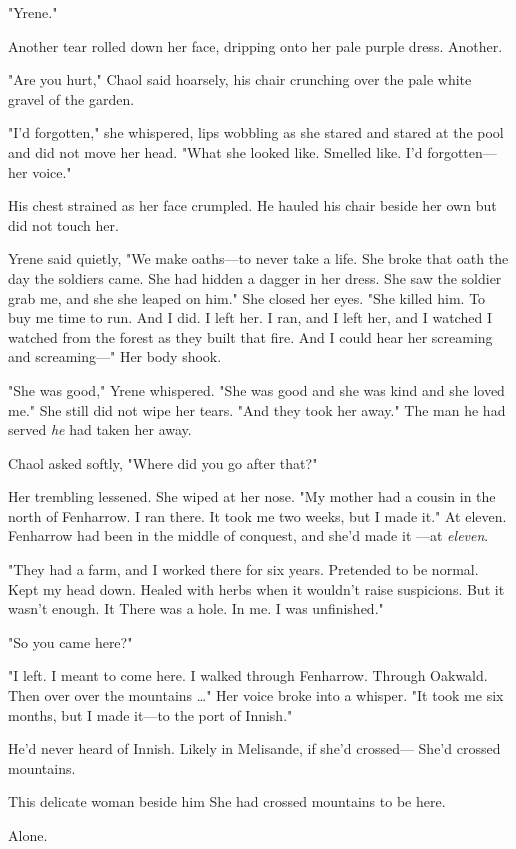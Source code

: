 "Yrene."

Another tear rolled down her face, dripping onto her pale purple dress. Another.

"Are you hurt," Chaol said hoarsely, his chair crunching over the pale white gravel of the garden.

"I'd forgotten," she whispered, lips wobbling as she stared and stared at the pool and did not move her head. "What she looked like. Smelled like. I'd forgotten---her voice."

His chest strained as her face crumpled. He hauled his chair beside her own but did not touch her.

Yrene said quietly, "We make oaths---to never take a life. She broke that oath the day the soldiers came. She had hidden a dagger in her dress. She saw the soldier grab me, and she  she leaped on him." She closed her eyes. "She killed him. To buy me time to run. And I did. I left her. I ran, and I left her, and I watched  I watched from the forest as they built that fire. And I could hear her screaming and screaming---" Her body shook.

"She was good," Yrene whispered. "She was good and she was kind and she loved me." She still did not wipe her tears. "And they took her away." The man he had served  \emph{he} had taken her away.

Chaol asked softly, "Where did you go after that?"

Her trembling lessened. She wiped at her nose. "My mother had a cousin in the north of Fenharrow. I ran there. It took me two weeks, but I made it." At eleven. Fenharrow had been in the middle of conquest, and she'd made it ---at \emph{eleven}.

"They had a farm, and I worked there for six years. Pretended to be normal. Kept my head down. Healed with herbs when it wouldn't raise suspicions. But it wasn't enough. It  There was a hole. In me. I was unfinished."

"So you came here?"

"I left. I meant to come here. I walked through Fenharrow. Through Oakwald. Then over  over the mountains \ldots" Her voice broke into a whisper. "It took me six months, but I made it---to the port of Innish."

He'd never heard of Innish. Likely in Melisande, if she'd crossed--- She'd crossed mountains.

This delicate woman beside him  She had crossed mountains to be here.

Alone.

